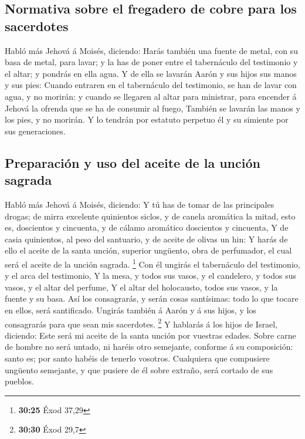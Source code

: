 \hypertarget{normativa-sobre-el-fregadero-de-cobre-para-los-sacerdotes}{%
\subsection{Normativa sobre el fregadero de cobre para los
sacerdotes}\label{normativa-sobre-el-fregadero-de-cobre-para-los-sacerdotes}}

 Habló más Jehová á Moisés, diciendo: 
Harás también una fuente de metal, con su basa de metal, para lavar; y
la has de poner entre el tabernáculo del testimonio y el altar; y
pondrás en ella agua.  Y de ella se lavarán Aarón y sus
hijos sus manos y sus pies:  Cuando entraren en el
tabernáculo del testimonio, se han de lavar con agua, y no morirán: y
cuando se llegaren al altar para ministrar, para encender á Jehová la
ofrenda que se ha de consumir al fuego,  También se
lavarán las manos y los pies, y no morirán. Y lo tendrán por estatuto
perpetuo él y su simiente por sus generaciones.

\hypertarget{preparaciuxf3n-y-uso-del-aceite-de-la-unciuxf3n-sagrada}{%
\subsection{Preparación y uso del aceite de la unción
sagrada}\label{preparaciuxf3n-y-uso-del-aceite-de-la-unciuxf3n-sagrada}}

 Habló más Jehová á Moisés, diciendo:  Y
tú has de tomar de las principales drogas; de mirra excelente quinientos
siclos, y de canela aromática la mitad, esto es, doscientos y cincuenta,
y de cálamo aromático doscientos y cincuenta,  Y de casia
quinientos, al peso del santuario, y de aceite de olivas un hin:
 Y harás de ello el aceite de la santa unción, superior
ungüento, obra de perfumador, el cual será el aceite de la unción
sagrada. \footnote{\textbf{30:25} Éxod 37,29}  Con él
ungirás el tabernáculo del testimonio, y el arca del testimonio,
 Y la mesa, y todos sus vasos, y el candelero, y todos
sus vasos, y el altar del perfume,  Y el altar del
holocausto, todos sus vasos, y la fuente y su basa.  Así
los consagrarás, y serán cosas santísimas: todo lo que tocare en ellos,
será santificado.  Ungirás también á Aarón y á sus hijos,
y los consagrarás para que sean mis sacerdotes. \footnote{\textbf{30:30}
  Éxod 29,7}  Y hablarás á los hijos de Israel, diciendo:
Este será mi aceite de la santa unción por vuestras edades.
 Sobre carne de hombre no será untado, ni haréis otro
semejante, conforme á su composición: santo es; por santo habéis de
tenerlo vosotros.  Cualquiera que compusiere ungüento
semejante, y que pusiere de él sobre extraño, será cortado de sus
pueblos.

